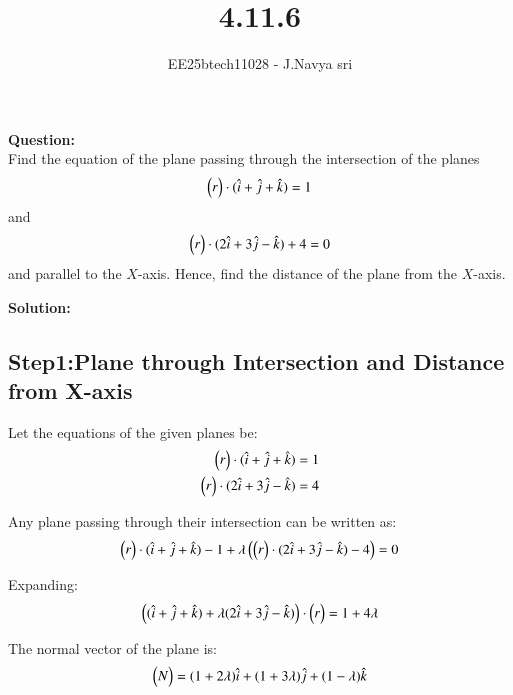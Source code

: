 \documentclass[journal]{IEEEtran}
\begin{document}

\vspace{3cm}

\title{4.11.6}
\author{EE25btech11028 - J.Navya sri}
{\let\newpage\relax\maketitle}


\textbf{Question:} \\
   Find the equation of the plane passing through the intersection of the planes 
\[
\begin{pmatrix}r\end{pmatrix} \cdot (\hat{i} + \hat{j} + \hat{k}) = 1
\]
and 
\[
\begin{pmatrix}r\end{pmatrix} \cdot (2\hat{i} + 3\hat{j} - \hat{k}) + 4 = 0
\]
and parallel to the $X$-axis. Hence, find the distance of the plane from the $X$-axis.
 
\bigskip
\textbf{Solution:}


\subsection*{Step1:Plane through Intersection and Distance from X-axis}
Let the equations of the given planes be:
\begin{align}
\begin{pmatrix}r\end{pmatrix} \cdot (\hat{i} + \hat{j} + \hat{k}) &= 1 \label{eq:plane1} \\
\begin{pmatrix}r\end{pmatrix} \cdot (2\hat{i} + 3\hat{j} - \hat{k}) &= 4 \label{eq:plane2}
\end{align}

Any plane passing through their intersection can be written as:
\begin{equation}
\begin{pmatrix}r\end{pmatrix} \cdot (\hat{i} + \hat{j} + \hat{k}) - 1 + \lambda \left(\begin{pmatrix}r\end{pmatrix} \cdot (2\hat{i} + 3\hat{j} - \hat{k}) - 4 \right) = 0
\label{eq:intersect_plane}
\end{equation}

Expanding:
\begin{equation}
\left( (\hat{i} + \hat{j} + \hat{k}) + \lambda (2\hat{i} + 3\hat{j} - \hat{k}) \right) \cdot \begin{pmatrix}r\end{pmatrix} = 1 + 4\lambda
\label{eq:expanded}
\end{equation}

The normal vector of the plane is:
\begin{equation}
\begin{pmatrix}N\end{pmatrix} = (1 + 2\lambda)\hat{i} + (1 + 3\lambda)\hat{j} + (1 - \lambda) \hat{k}
\label{eq:normal}
\end{equation}
\end{document}
